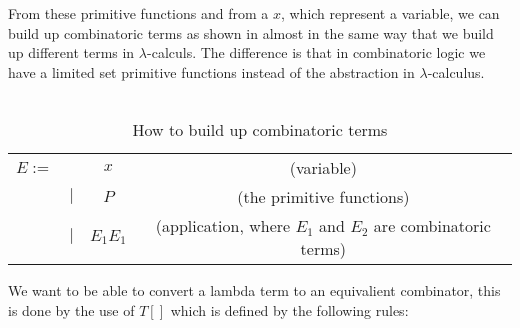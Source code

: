From these primitive functions and from a $x$, which represent a variable,  we can build up combinatoric terms as shown in  
almost in the same way that we build up different terms in $\lambda$-calculs. The difference is that in combinatoric logic we have a limited set 
primitive functions instead of the abstraction in $\lambda$-calculus.
\\ \\
\begin{table}[]
    \centering
    \begin{tabular}{c c c | c}
         $E :=$&  & $x$ & (variable)\\
         & $|$ & $P$ & (the primitive functions) \\
         & $|$ & $E_1 E_1$ & (application, where $E_1$ and $E_2$ are combinatoric terms)\\
    \end{tabular}
    \caption{How to build up combinatoric terms}
    \label{tab:makeCombinatoricTerms}
\end{table}
We want to be able to convert a lambda term to an equivalient combinator, this is done by the use of $T[]$ which is 
defined by the following rules:

